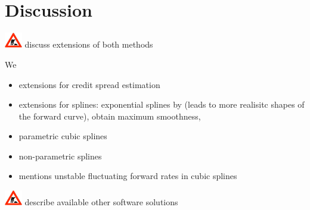 \clearpage
\section{Discussion}

\includegraphics[width=0.3in]{baustelle} discuss extensions of both methods

We 

\begin{itemize}
\item extensions for credit spread estimation \cite{Jankowitsch2004, Geyer2004}
\item extensions for splines: exponential splines by \cite{Vasicek1982} (leads to more realisitc shapes of the forward curve), \cite{Adams1994} obtain maximum smoothness, \cite{Fisher1995, Waggoner1997, Anderson1999 }
\end{itemize}


\begin{itemize}
\item parametric cubic splines \cite{McCulloch1971, McCulloch1975}
\item non-parametric splines \cite{Adams1994,Fisher1995, Waggoner1997, Tanggaard1997, Shea1985}
\item \cite{Shea1985} mentions unstable fluctuating forward rates in \cite{McCulloch1975} cubic splines

\end{itemize}

\includegraphics[width=0.3in]{baustelle} describe available other software solutions

